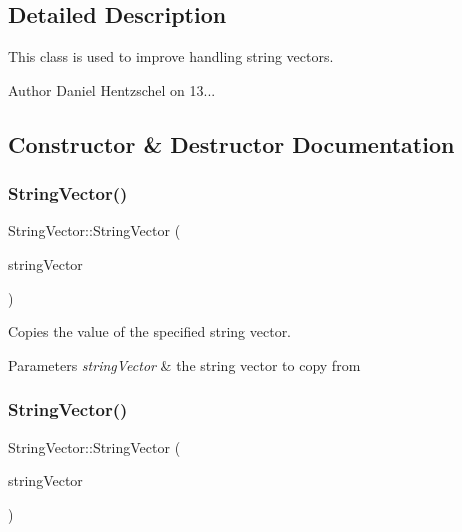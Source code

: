 \subsection{Detailed Description}
This class is used to improve handling string vectors. 

\begin{DoxyAuthor}{Author}
Daniel Hentzschel on 13... 
\end{DoxyAuthor}


\subsection{Constructor \& Destructor Documentation}
\mbox{\label{class_string_vector_ad550561da75be936dda9071f6e0b4a58}} 
\subsubsection{\texorpdfstring{StringVector()}{StringVector()}\hspace{0.1cm}{\footnotesize\ttfamily [1/2]}}
{\footnotesize\ttfamily String\+Vector\+::\+String\+Vector (\begin{DoxyParamCaption}\item[{const \mbox{\hyperlink{class_string_vector}{String\+Vector}} \&}]{string\+Vector }\end{DoxyParamCaption})}



Copies the value of the specified string vector. 


\begin{DoxyParams}{Parameters}
{\em string\+Vector} & the string vector to copy from \\
\hline
\end{DoxyParams}
\mbox{\label{class_string_vector_ab8b7a61d3ebe3c40e7c080bf68970ad2}} 
\subsubsection{\texorpdfstring{StringVector()}{StringVector()}\hspace{0.1cm}{\footnotesize\ttfamily [2/2]}}
{\footnotesize\ttfamily String\+Vector\+::\+String\+Vector (\begin{DoxyParamCaption}\item[{const \mbox{\hyperlink{class_a_vector}{A\+Vector}}$<$ \mbox{\hyperlink{class_a_string}{A\+String}} $>$ \&}]{string\+Vector }\end{DoxyParamCaption})}



